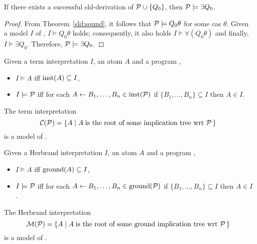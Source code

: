 \begin{cor}
    If there exists a successful \gls{sld}-derivation of \(\mathcal{P} \cup \lbrace Q_0 \rbrace\), then \(\mathcal{P} \models \exists{Q_0}\).
\end{cor}
\begin{proof}
    From Theorem~\ref{sld:sound}, it follows that \(\mathcal{P} \models Q_0\theta\) for some \gls{cas} \(\theta\).
    Given a model \(I\) of \prog, \(I \models Q_0\theta\) holds; consequently, it also holds \(I \models \forall{(Q_0\theta)}\) and finally, \(I \models \exists{Q_0}\).
    Therefore, \(\mathcal{P} \models \exists{Q_0}\).
\end{proof}

\begin{lem}
    \label{decl:lem-3}
    Given a term interpretation \(I\), an atom \(A\) and a program \prog,
    \begin{itemize}
        \item \(I \models A\) iff \(\operatorname{inst}(A) \subseteq I\),
        \item \(I \models \mathcal{P}\) iff for each \(A \leftarrow B_1, \dotsc, B_n \in \operatorname{inst}(\mathcal{P})\) if \(\lbrace B_1,\dotsc,B_n \rbrace \subseteq I\) then \(A \in I\).
    \end{itemize}
\end{lem}

\begin{lem}
    \label{decl:lem-4}
    The term interpretation
    \begin{equation*}
        \mathcal{C}(\mathcal{P}) = \lbrace A \mid A\;\text{is the root of some implication tree wrt \ensuremath{\mathcal{P}}}\,\rbrace
    \end{equation*}
    is a model of \prog.
\end{lem}

\begin{lem}
    Given a Herbrand interpretation \(I\), an atom \(A\) and a program \prog,
    \begin{itemize}
        \item \(I \models A\) iff \(\operatorname{ground}(A) \subseteq I\),
        \item \(I \models \mathcal{P}\) iff for each \(A \leftarrow B_1, \dotsc, B_n \in \operatorname{ground}(\mathcal{P})\) if \(\lbrace B_1,\dotsc,B_n \rbrace \subseteq I\) then \(A \in I\).
    \end{itemize}
\end{lem}

\begin{lem}
    The Herbrand interpretation
    \begin{equation*}
        \mathcal{M}(\mathcal{P}) = \lbrace A \mid A\;\text{is the root of some ground implication tree wrt \ensuremath{\mathcal{P}}}\,\rbrace
    \end{equation*}
    is a model of \prog.
\end{lem}

